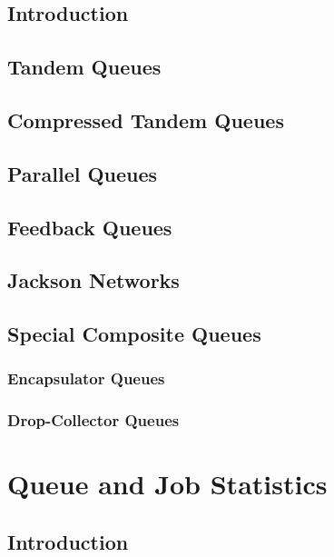 \documentclass[12pt]{book}
\begin{document}
\section{Introduction}

\section{Tandem Queues}

\section{Compressed Tandem Queues}

\section{Parallel Queues}

\section{Feedback Queues}

\section{Jackson Networks}

\section{Special Composite Queues}

\subsection{Encapsulator Queues}

\subsection{Drop-Collector Queues}

\chapter{Queue and Job Statistics}

\section{Introduction}
\label{stat-intro}
\end{document}
